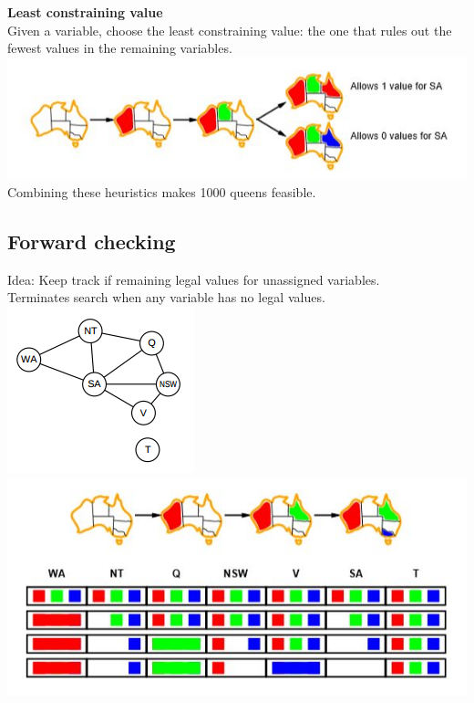 \textbf{Least constraining value}\\
Given a variable, choose the least constraining value: the one that rules out the fewest values in the remaining variables.\\

\includegraphics[scale=1]{chap1_pics/backtrack3.jpeg}
Combining these heuristics makes 1000 queens feasible.\\


\subsection{Forward checking}
Idea: Keep track if remaining legal values for unassigned variables.\\
Terminates search when any variable has no legal values.\\

\includegraphics[scale=1]{chap1_pics/australiamap.png}\\
\includegraphics[scale=1]{chap1_pics/backtrack4.jpeg}

